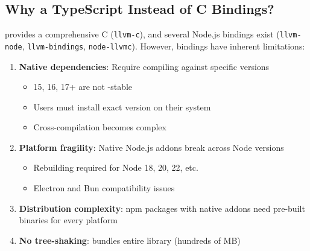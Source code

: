 \subsection{Why a TypeScript  Instead of C Bindings?}

 provides a comprehensive C  (\texttt{llvm-c}), and several Node.js bindings exist (\texttt{llvm-node}\cite{llvmnode}, \texttt{llvm-bindings}\cite{llvmbindings}, \texttt{node-llvmc}\cite{nodellvmc}). However,  bindings have inherent limitations:

\begin{enumerate}[noitemsep]
  \item \textbf{Native dependencies}: Require compiling against specific  versions
  \begin{itemize}[noitemsep]
    \item {} 15, 16, 17+ are not -stable
    \item Users must install exact  version on their system
    \item Cross-compilation becomes complex
  \end{itemize}

  \item \textbf{Platform fragility}: Native Node.js addons break across Node versions
  \begin{itemize}[noitemsep]
    \item Rebuilding required for Node 18, 20, 22, etc.
    \item Electron and Bun compatibility issues
  \end{itemize}

  \item \textbf{Distribution complexity}: npm packages with native addons need pre-built binaries for every platform

  \item \textbf{No tree-shaking}:  bundles entire  library (hundreds of MB)
\end{enumerate}

